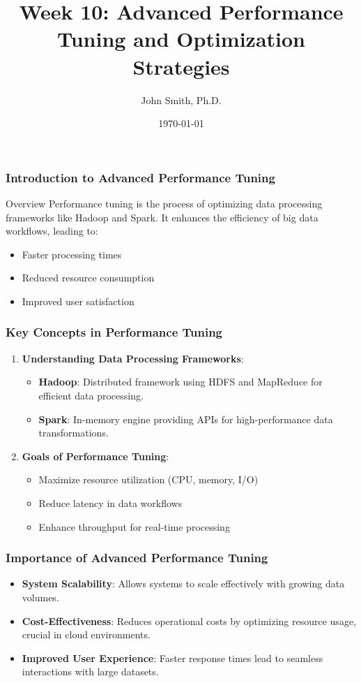 \documentclass[aspectratio=169]{beamer}
\title[Week 10]{Week 10: Advanced Performance Tuning and Optimization Strategies}
\author[J. Smith]{John Smith, Ph.D.}
\institute[University Name]{
  Department of Computer Science\\
  University Name\\
  \vspace{0.3cm}
  Email: email@university.edu\\
  Website: www.university.edu
}
\date{\today}
\begin{document}
\frame{\titlepage}

\begin{frame}[fragile]
    \frametitle{Introduction to Advanced Performance Tuning}
    \begin{block}{Overview}
        Performance tuning is the process of optimizing data processing frameworks like Hadoop and Spark. It enhances the efficiency of big data workflows, leading to:
        \begin{itemize}
            \item Faster processing times
            \item Reduced resource consumption
            \item Improved user satisfaction
        \end{itemize}
    \end{block}
\end{frame}

\begin{frame}[fragile]
    \frametitle{Key Concepts in Performance Tuning}
    \begin{enumerate}
        \item \textbf{Understanding Data Processing Frameworks}:
            \begin{itemize}
                \item \textbf{Hadoop}: Distributed framework using HDFS and MapReduce for efficient data processing.
                \item \textbf{Spark}: In-memory engine providing APIs for high-performance data transformations.
            \end{itemize}
        
        \item \textbf{Goals of Performance Tuning}:
            \begin{itemize}
                \item Maximize resource utilization (CPU, memory, I/O)
                \item Reduce latency in data workflows
                \item Enhance throughput for real-time processing
            \end{itemize}
    \end{enumerate}
\end{frame}

\begin{frame}[fragile]
    \frametitle{Importance of Advanced Performance Tuning}
    \begin{itemize}
        \item \textbf{System Scalability}: Allows systems to scale effectively with growing data volumes.
        \item \textbf{Cost-Effectiveness}: Reduces operational costs by optimizing resource usage, crucial in cloud environments.
        \item \textbf{Improved User Experience}: Faster response times lead to seamless interactions with large datasets.
    \end{itemize}
\end{frame}
\end{document}
